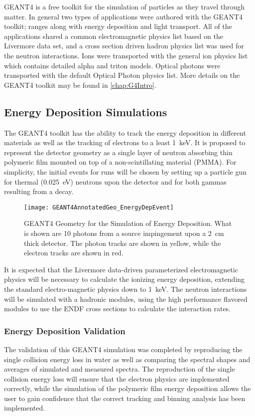 GEANT4 is a free toolkit for the simulation of particles as they travel through matter\cite{agostinelli_geant4simulation_2003}.
In general two types of applications were authored with the GEANT4 toolkit; ranges along with energy deposition and light transport.
All of the applications shared a common electromagnetic physics list based on the Livermore data set, and a cross section driven hadron physics list was used for the neutron interactions.
Ions were transported with the general ion physics list which contains detailed alpha and triton models.
Optical photons were transported with the default Optical Photon physics list.
More details on the GEANT4 toolkit may be found in \autoref{chap:G4Intro}.

\subsection{Energy Deposition Simulations}
\label{sec:EnergyDeposition}
The GEANT4 toolkit has the ability to track the energy deposition in different materials as well as the tracking of electrons to a least \SI{1}{\keV}\cite{agostinelli_geant4simulation_2003}.
It is proposed to represent the detector geometry as a single layer of neutron absorbing thin polymeric film mounted on top of a non-scintillating material (PMMA).
For simplicity, the initial events for runs will be chosen by setting up a particle gun for thermal (\SI{0.025}{\eV}) neutrons upon the detector and for both gammas resulting from a  decay.
\begin{figure}
  \texttt{[image: GEANT4AnnotatedGeo\_EnergyDepEvent]}
	\caption[GEANT4 Energy Deposition Geometry]{GEANT4 Geometry for the Simulation of Energy Deposition. What is shown are 10 photons from a  source impingement upon a \SI{2}{\cm} thick detector.  The photon tracks are shown in yellow, while the electron tracks are shown in red.}
	\label{fig:EDepSimGeo}
\end{figure}
It is expected that the Livermore data-driven parameterized electromagnetic physics will be necessary to calculate the ionizing energy deposition, extending the standard electro-magnetic physics down to \SI{1}{\kilo\eV}.
The neutron interactions will be simulated with a hadronic modules, using the high performance flavored modules to use the ENDF cross sections to calculate the interaction rates.

\subsubsection{Energy Deposition Validation}
The validation of this GEANT4 simulation was completed by reproducing the single collision energy loss in water as well as comparing  the spectral shapes and averages of simulated and measured spectra.
The reproduction of the single collision energy loss will ensure that the electron physics are implemented correctly, while the simulation of the polymeric film energy deposition allows the user to gain confidence that the correct tracking and binning analysis has been implemented.

